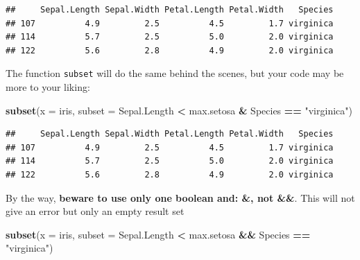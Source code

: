 \documentclass[]{book}
\newenvironment{Shaded}{\begin{snugshade}}{\end{snugshade}}
\newcommand{\DataTypeTok}[1]{\textcolor[rgb]{0.13,0.29,0.53}{#1}}
\newcommand{\KeywordTok}[1]{\textcolor[rgb]{0.13,0.29,0.53}{\textbf{#1}}}
\newcommand{\NormalTok}[1]{#1}
\newcommand{\OperatorTok}[1]{\textcolor[rgb]{0.81,0.36,0.00}{\textbf{#1}}}
\newcommand{\StringTok}[1]{\textcolor[rgb]{0.31,0.60,0.02}{#1}}
\begin{document}
\begin{Shaded}
\end{Shaded}

\begin{verbatim}
##     Sepal.Length Sepal.Width Petal.Length Petal.Width   Species
## 107          4.9         2.5          4.5         1.7 virginica
## 114          5.7         2.5          5.0         2.0 virginica
## 122          5.6         2.8          4.9         2.0 virginica
\end{verbatim}

The function \texttt{subset} will do the same behind the scenes, but your code may be more to your liking:

\begin{Shaded}
\begin{Highlighting}[]
\KeywordTok{subset}\NormalTok{(}\DataTypeTok{x =}\NormalTok{ iris,}
       \DataTypeTok{subset =}\NormalTok{ Sepal.Length }\OperatorTok{<}\StringTok{ }\NormalTok{max.setosa }\OperatorTok{&}\StringTok{ }\NormalTok{Species }\OperatorTok{==}\StringTok{ "virginica"}\NormalTok{)}
\end{Highlighting}
\end{Shaded}

\begin{verbatim}
##     Sepal.Length Sepal.Width Petal.Length Petal.Width   Species
## 107          4.9         2.5          4.5         1.7 virginica
## 114          5.7         2.5          5.0         2.0 virginica
## 122          5.6         2.8          4.9         2.0 virginica
\end{verbatim}

By the way, \textbf{beware to use only one boolean and: \&, not \&\&}. This will not give an error but only an empty result set

\begin{Shaded}
\begin{Highlighting}[]
\KeywordTok{subset}\NormalTok{(}\DataTypeTok{x =}\NormalTok{ iris,}
       \DataTypeTok{subset =}\NormalTok{ Sepal.Length }\OperatorTok{<}\StringTok{ }\NormalTok{max.setosa }\OperatorTok{&&}\StringTok{ }\NormalTok{Species }\OperatorTok{==}\StringTok{ "virginica"}\NormalTok{)}
\end{Highlighting}
\end{Shaded}
\end{document}
